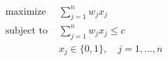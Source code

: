 \begin{align*}
\text{maximize } & \sum_{j=1}^n w_j x_j \\
\text{subject to } & \sum_{j=1}^n w_j x_j \leq c \\
& x_j \in \lbrace 0, 1 \rbrace, \quad j = 1, \ldots,n
\end{align*}


